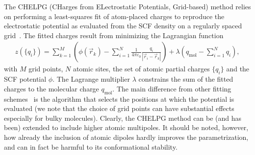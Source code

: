 The CHELPG (CHarges from ELectrostatic Potentials, Grid-based) method relies on performing a least-squares fit of atom-placed charges to reproduce the electrostatic potential as evaluated from the SCF density on a regularly spaced grid~\cite{breneman_determining_1990}. The fitted charges result from minimizing the Lagrangian function~\cite{chirlian_atomic_1987}
\begin{align}
 z(\{q_i\}) = \sum_{k=1}^M \left( \phi(\vec{r}_k) - \sum_{i=1}^N \frac{1}{4\pi\varepsilon_0} \frac{q_i}{|\vec{r}_i-\vec{r}_k|} \right) + \lambda \left( q_\textrm{mol} - \sum_{i=1}^N q_i \right),
\end{align}
with $M$ grid points, $N$ atomic sites, the set of atomic partial charges $\{q_i\}$ and the SCF potential $\phi$. The Lagrange multiplier $\lambda$ constrains the sum of the fitted charges to the molecular charge $q_\textrm{mol}$. The main difference from other fitting schemes~\cite{singh_approach_1984} is the algorithm that selects the positions at which the potential is evaluated (we note that the choice of grid points can have substantial effects especially for bulky molecules).
Clearly, the CHELPG method can be (and has been) extended to include higher atomic multipoles. It should be noted, however, how already the inclusion of atomic dipoles hardly improves the parametrization, and can in fact be harmful to its conformational stability.

